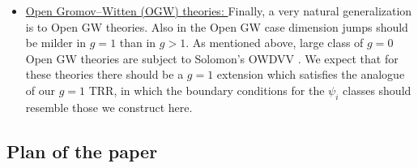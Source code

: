 \documentclass[11pt]{amsart}
\theoremstyle{definition}
\theoremstyle{remark}
\newcommand{\<}{\left<}
\renewcommand{\>}{\right>}
\numberwithin{equation}{section}
\begin{document}
\begin{itemize}
this setting, and %
to seek TRRs for them. 
    \item \underline{Open Gromov--Witten (OGW) theories: }
    Finally, a very natural generalization is to Open GW theories. Also in the Open %
GW case dimension %
jumps should be milder in $g=1$ than in $g>1.$ 
    As mentioned above, large class of %
$g=0$ Open GW %
theories are subject to Solomon's OWDVV \cite{sol_owdvv,solomon2023relative}. We expect that for these theories there should be a $g=1$ extension which satisfies the analogue of our $g=1$ TRR, in which the boundary conditions for the $\psi_i$ classes should resemble those we construct here.
\end{itemize}
\subsection{Plan of the paper}
\end{document}
